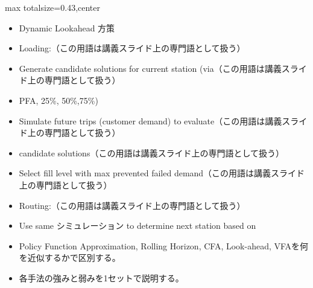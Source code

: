 \clearpage
{}
\begin{minipage}[t]{0.405\textwidth}
\begin{adjustbox}{max totalsize={\textwidth}{0.43\textheight},center}
\begin{minipage}{\textwidth}\scriptsize
{}\begin{itemize}
\item Dynamic Lookahead 方策
\item Loading:（この用語は講義スライド上の専門語として扱う）
\item Generate candidate solutions for current station (via（この用語は講義スライド上の専門語として扱う）
\item PFA, 25\%, 50\%,75\%)
\item Simulate future trips (customer demand) to evaluate（この用語は講義スライド上の専門語として扱う）
\item candidate solutions（この用語は講義スライド上の専門語として扱う）
\item Select fill level with max prevented failed demand（この用語は講義スライド上の専門語として扱う）
\item Routing:（この用語は講義スライド上の専門語として扱う）
\item Use same シミュレーション to determine next station based on
\end{itemize}\begin{itemize}
\item Policy Function Approximation, Rolling Horizon, CFA, Look-ahead, VFAを何を近似するかで区別する。
\item 各手法の強みと弱みを1セットで説明する。
\end{itemize}
\end{minipage}
\end{adjustbox}
\end{minipage}\hfill
